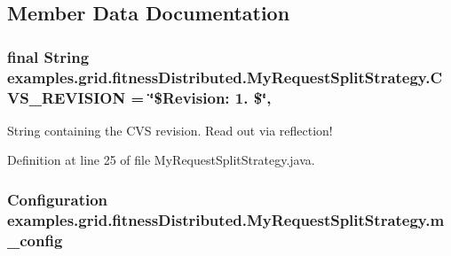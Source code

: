 \subsection{Member Data Documentation}
\hypertarget{classexamples_1_1grid_1_1fitness_distributed_1_1_my_request_split_strategy_a9f28bdbae159523bc23cb0f3a3de981c}{
\subsubsection[{C\-V\-S\-\_\-\-R\-E\-V\-I\-S\-I\-O\-N}]{\setlength{\rightskip}{0pt plus 5cm}final String examples.\-grid.\-fitness\-Distributed.\-My\-Request\-Split\-Strategy.\-C\-V\-S\-\_\-\-R\-E\-V\-I\-S\-I\-O\-N = \char`\"{}\$Revision\-: 1. \$\char`\"{}\hspace{0.3cm}{\ttfamily [static]}, {\ttfamily [private]}}}\label{classexamples_1_1grid_1_1fitness_distributed_1_1_my_request_split_strategy_a9f28bdbae159523bc23cb0f3a3de981c}
String containing the C\-V\-S revision. Read out via reflection! 

Definition at line 25 of file My\-Request\-Split\-Strategy.\-java.

\hypertarget{classexamples_1_1grid_1_1fitness_distributed_1_1_my_request_split_strategy_af99e86a7a640ecd4cf7d5048654beb67}{
\subsubsection[{m\-\_\-config}]{\setlength{\rightskip}{0pt plus 5cm}Configuration examples.\-grid.\-fitness\-Distributed.\-My\-Request\-Split\-Strategy.\-m\-\_\-config\hspace{0.3cm}{\ttfamily [private]}}}\label{classexamples_1_1grid_1_1fitness_distributed_1_1_my_request_split_strategy_af99e86a7a640ecd4cf7d5048654beb67}


